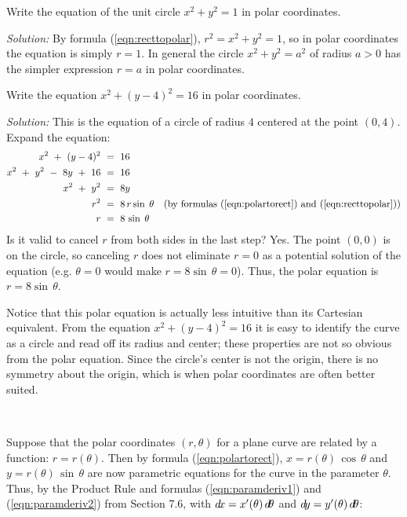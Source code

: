 \begin{exmp}\label{exmp:polarcircle}
 Write the equation of the unit circle $x^2 + y^2 = 1$ in polar
 coordinates.\vspace{1mm}
 \par\noindent\emph{Solution:} By formula (\ref{eqn:recttopolar}),
 $r^2 = x^2 + y^2 = 1$, so in polar coordinates the equation is simply $r = 1$.
 In general the circle $x^2+y^2=a^2$ of radius $a>0$ has the simpler expression
 $r=a$ in polar coordinates.
\end{exmp}
\begin{exmp}
 Write the equation $x^2 + (y-4)^2 = 16$ in polar coordinates.\vspace{1mm}
 \par\noindent\emph{Solution:} This is the equation of a circle of radius $4$
 centered at the point $(0,4)$. Expand the equation:
 \begin{align*}
  x^2 ~+~ (y-4)^2 ~&=~ 16\\
  x^2 ~+~ y^2 ~-~ 8y ~+~ 16 ~&=~ 16\\
  x^2 ~+~ y^2 ~&=~ 8y\\
  r^2 ~&=~ 8\,r\sin\;\theta \quad\text{(by formulas (\ref{eqn:polartorect})
           and (\ref{eqn:recttopolar}))}\\
  r ~&=~ 8\,\sin\;\theta
 \end{align*}
 Is it valid to cancel $r$ from both sides in the last step? Yes. The point
 $(0,0)$ is on the circle, so canceling $r$ does not eliminate $r=0$ as a
 potential solution of the equation (e.g. $\theta=0$ would make
 $r = 8 \sin\,\theta = 0$). Thus, the polar equation is
 $r = 8 \sin\,\theta$.\vspace{1mm}
 
 \noindent Notice that this polar equation is actually less intuitive than its
 Cartesian equivalent. From the equation $x^2 + (y-4)^2 = 16$ it is easy to
 identify the curve as a circle and read off its radius and center; these
 properties are not so obvious from the polar equation. Since the circle's
 center is not the origin, there is no symmetry about the origin, which is when
 polar coordinates are often better suited.
\end{exmp}
\divider
\newpage
\par{}\\
\par Suppose that the polar coordinates $(r,\theta)$ for a plane curve are related by
a function: $r=r(\theta)$. Then by formula (\ref{eqn:polartorect}),
$x=r(\theta)\,\cos\,\theta$ and $y=r(\theta)\,\sin\,\theta$ are now parametric
equations for the curve in the parameter $\theta$. Thus, by the Product Rule
and formulas
(\ref{eqn:paramderiv1}) and (\ref{eqn:paramderiv2}) from Section 7.6, with
$d\!x=x'(\theta)\,d\!\theta$ and
$d\!y=y'(\theta)\,d\!\theta$:

